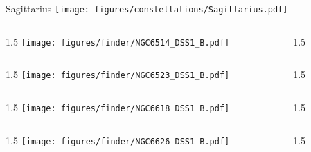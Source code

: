\documentclass[final]{beamer}
\newlength{\colwidth}
\begin{document}

\begin{frame}[t]{\LARGE Sagittarius}
  \centering
  \texttt{[image: figures/constellations/Sagittarius.pdf]}
\end{frame}


\begin{frame}[t]{}
  \begin{columns}[T]
    \begin{column}{1.5\colwidth}
      \centering
      \texttt{[image: figures/finder/NGC6514\_DSS1\_B.pdf]}
    \end{column}
    \begin{column}{1.5\colwidth}
      \Large
      
    \end{column}
  \end{columns}
  \vspace{\fill}
  \begin{columns}[T]
    \begin{column}{1.5\colwidth}
      \centering
      \texttt{[image: figures/finder/NGC6523\_DSS1\_B.pdf]}
    \end{column}
    \begin{column}{1.5\colwidth}
      \Large
      
    \end{column}
  \end{columns}
\end{frame}


\begin{frame}[t]{}
  \begin{columns}[T]
    \begin{column}{1.5\colwidth}
      \centering
      \texttt{[image: figures/finder/NGC6618\_DSS1\_B.pdf]}
    \end{column}
    \begin{column}{1.5\colwidth}
      \Large
      
    \end{column}
  \end{columns}
  \vspace{\fill}
  \begin{columns}[T]
    \begin{column}{1.5\colwidth}
      \centering
      \texttt{[image: figures/finder/NGC6626\_DSS1\_B.pdf]}
    \end{column}
    \begin{column}{1.5\colwidth}
      \Large
      
    \end{column}
  \end{columns}
\end{frame}
\end{document}
